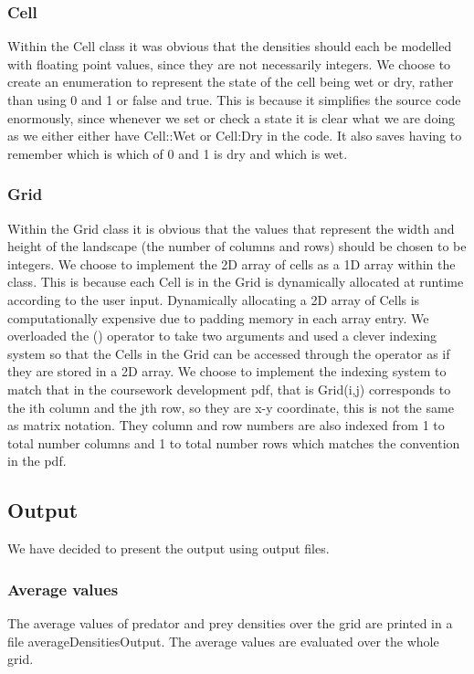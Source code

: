 \subsubsection{Cell}
Within the Cell class it was obvious that the densities should each be modelled with floating point values, since they are not necessarily integers. We choose to create an enumeration to represent the state of the cell being wet or dry, rather than using 0 and 1 or false and true. This is because it simplifies the source code enormously, since whenever we set or check a state it is clear what we are doing as we either either have Cell::Wet or Cell:Dry in the code. It also saves having to remember which is which of 0 and 1 is dry and which is wet. 

\subsubsection{Grid}
Within the Grid class it is obvious that the values that represent the width and height of the landscape (the number of columns and rows) should be chosen to be integers. We choose to implement the 2D array of cells as a 1D array within the class. This is because each Cell is in the Grid is dynamically allocated at runtime according to the user input. Dynamically allocating a 2D array of Cells is computationally expensive due to padding memory in each array entry. We overloaded the () operator to take two arguments and used a clever indexing system so that the Cells in the Grid can be accessed through the operator as if they are stored in a 2D array. We choose to implement the indexing system to match that in the coursework development pdf, that is Grid(i,j) corresponds to the ith column and the jth row, so they are x-y coordinate, this is not the same as matrix notation. They column and row numbers are also indexed from 1 to total number columns and 1 to total number rows which matches the convention in the pdf.

\subsection{Output}
We have decided to present the output using output files.

\subsubsection{Average values}
The average values of predator and prey densities over the grid are printed in a file averageDensitiesOutput. The average values are evaluated over the whole grid.

